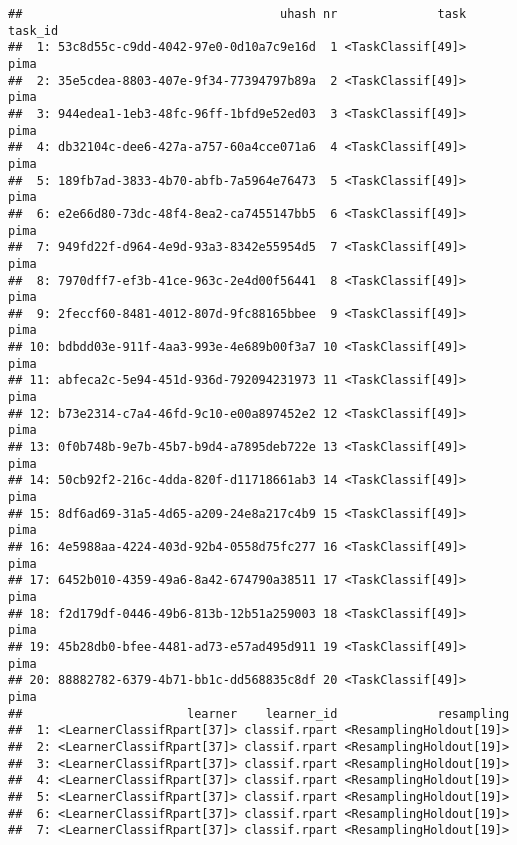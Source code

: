\documentclass[
]{scrbook}
\newenvironment{Shaded}{\begin{snugshade}}{\end{snugshade}}
\newcommand{\FunctionTok}[1]{\textcolor[rgb]{0.00,0.00,0.00}{#1}}
\newcommand{\NormalTok}[1]{#1}
\newcommand{\SpecialCharTok}[1]{\textcolor[rgb]{0.00,0.00,0.00}{#1}}
\newcommand{\StringTok}[1]{\textcolor[rgb]{0.31,0.60,0.02}{#1}}
\renewenvironment{Shaded} {\begin{snugshade}\small} {\end{snugshade}}
\begin{document}
\begin{Shaded}
\end{Shaded}

\begin{verbatim}
##                                    uhash nr              task task_id
##  1: 53c8d55c-c9dd-4042-97e0-0d10a7c9e16d  1 <TaskClassif[49]>    pima
##  2: 35e5cdea-8803-407e-9f34-77394797b89a  2 <TaskClassif[49]>    pima
##  3: 944edea1-1eb3-48fc-96ff-1bfd9e52ed03  3 <TaskClassif[49]>    pima
##  4: db32104c-dee6-427a-a757-60a4cce071a6  4 <TaskClassif[49]>    pima
##  5: 189fb7ad-3833-4b70-abfb-7a5964e76473  5 <TaskClassif[49]>    pima
##  6: e2e66d80-73dc-48f4-8ea2-ca7455147bb5  6 <TaskClassif[49]>    pima
##  7: 949fd22f-d964-4e9d-93a3-8342e55954d5  7 <TaskClassif[49]>    pima
##  8: 7970dff7-ef3b-41ce-963c-2e4d00f56441  8 <TaskClassif[49]>    pima
##  9: 2feccf60-8481-4012-807d-9fc88165bbee  9 <TaskClassif[49]>    pima
## 10: bdbdd03e-911f-4aa3-993e-4e689b00f3a7 10 <TaskClassif[49]>    pima
## 11: abfeca2c-5e94-451d-936d-792094231973 11 <TaskClassif[49]>    pima
## 12: b73e2314-c7a4-46fd-9c10-e00a897452e2 12 <TaskClassif[49]>    pima
## 13: 0f0b748b-9e7b-45b7-b9d4-a7895deb722e 13 <TaskClassif[49]>    pima
## 14: 50cb92f2-216c-4dda-820f-d11718661ab3 14 <TaskClassif[49]>    pima
## 15: 8df6ad69-31a5-4d65-a209-24e8a217c4b9 15 <TaskClassif[49]>    pima
## 16: 4e5988aa-4224-403d-92b4-0558d75fc277 16 <TaskClassif[49]>    pima
## 17: 6452b010-4359-49a6-8a42-674790a38511 17 <TaskClassif[49]>    pima
## 18: f2d179df-0446-49b6-813b-12b51a259003 18 <TaskClassif[49]>    pima
## 19: 45b28db0-bfee-4481-ad73-e57ad495d911 19 <TaskClassif[49]>    pima
## 20: 88882782-6379-4b71-bb1c-dd568835c8df 20 <TaskClassif[49]>    pima
##                       learner    learner_id              resampling
##  1: <LearnerClassifRpart[37]> classif.rpart <ResamplingHoldout[19]>
##  2: <LearnerClassifRpart[37]> classif.rpart <ResamplingHoldout[19]>
##  3: <LearnerClassifRpart[37]> classif.rpart <ResamplingHoldout[19]>
##  4: <LearnerClassifRpart[37]> classif.rpart <ResamplingHoldout[19]>
##  5: <LearnerClassifRpart[37]> classif.rpart <ResamplingHoldout[19]>
##  6: <LearnerClassifRpart[37]> classif.rpart <ResamplingHoldout[19]>
##  7: <LearnerClassifRpart[37]> classif.rpart <ResamplingHoldout[19]>

\end{verbatim}
\end{document}
